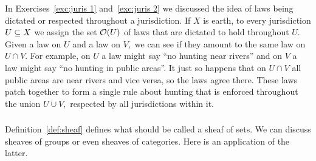 \documentclass[CT4S-EN-RU]{subfiles}
\begin{document}
\begin{applicationRUS}
\end{applicationRUS}

\begin{exampleENG}
In Exercises~\ref{exc:juris 1} and~\ref{exc:juris 2} we discussed the idea of laws being dictated or respected throughout a jurisdiction. If $X$ is earth, to every jurisdiction $U\ss X$ we assign the set $\mcO(U)$ of laws that are dictated to hold throughout $U.$ Given a law on $U$ and a law on $V,$ we can see if they amount to the same law on $U\cap V.$ For example, on $U$ a law  might say “no hunting near rivers” and on $V$ a law might say “no hunting in public areas”. It just so happens that on $U\cap V$ all public areas are near rivers and vice versa, so the laws agree there. These laws patch together to form a single rule about hunting that is enforced throughout the union $U\cup V,$ respected by all jurisdictions within it.
\end{exampleENG}

\begin{exampleRUS}
\end{exampleRUS}


\subsubsection{}

\begin{blockENG}
Definition~\ref{def:sheaf} defines what should be called a sheaf of sets. We can discuss sheaves of groups or even sheaves of categories. Here is an application of the latter.
\end{blockENG}

\begin{blockRUS}
\end{blockRUS}
\end{document}
